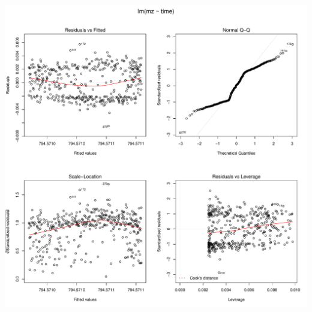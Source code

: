 \documentclass[]{article}
\begin{document}
\includegraphics{Supplementary_document_files/figure-latex/fit.lin.794-1.pdf}
\end{document}
